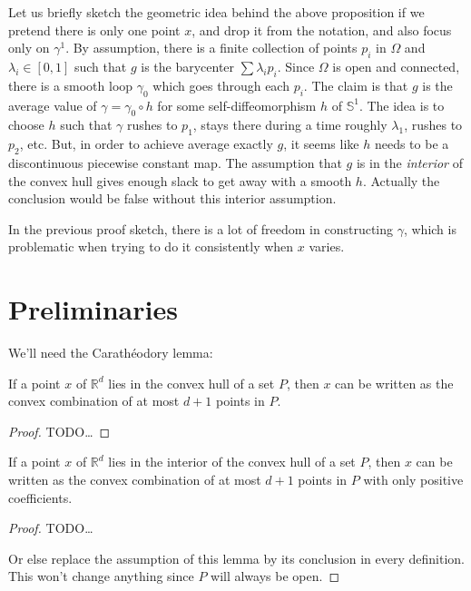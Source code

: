 Let us briefly sketch the geometric idea behind the above proposition
if we pretend there is only one point $x$, and drop it from the
notation, and also focus only on $γ^1$.
By assumption, there is a finite collection of points $p_i$ in $Ω$ and $λ_i ∈
[0, 1]$ such that $g$ is the barycenter $\sum λ_i p_i$. Since $Ω$ is open and
connected, there is a smooth loop $γ_0$ which goes through each $p_i$. The
claim is that $g$ is the average value of $γ = γ_0 ∘ h$ for some
self-diffeomorphism $h$ of $𝕊^1$. The idea is to choose $h$ such that
$γ$ rushes to $p_1$, stays there during a time roughly $λ_1$, rushes to
$p_2$, etc. But, in order to achieve average exactly $g$, it seems like $h$
needs to be a discontinuous piecewise constant map. The assumption that $g$ is
in the \emph{interior} of the convex hull gives enough slack to get away with
a smooth $h$.  Actually the
conclusion would be false without this interior assumption.

In the previous proof sketch, there is a lot of freedom in constructing $γ$,
which is problematic when trying to do it consistently when $x$ varies.

\section{Preliminaries}
\label{sec:preliminaries}

We'll need the Carathéodory lemma:

\begin{lemma}
\label{lem:caratheodory}
\leanok
{}
  If a point $x$ of $ℝ^d$ lies in the convex hull of a set $P$,
  then $x$ can be written as the convex combination of at most $d + 1$
  points in $P$.
\end{lemma}

\begin{proof}
  TODO\dots
\end{proof}

\begin{lemma}
  \label{lem:int_cvx}
  If a point $x$ of $ℝ^d$ lies in the interior of the convex hull of a set $P$,
  then $x$ can be written as the convex combination of at most $d + 1$
  points in $P$ with only positive coefficients.
\end{lemma}

\begin{proof}
  TODO\dots

  Or else replace the assumption of this lemma by its conclusion in
  every definition. This won't change anything since $P$ will always be
  open.
\end{proof}


